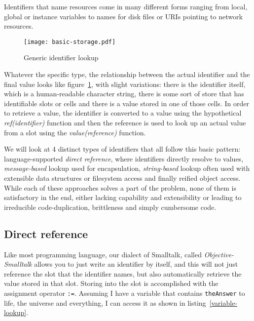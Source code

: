 \documentclass[preprint,authoryear]{acm_proc_article-sp}
\begin{document}
Identifiers that name resources come in many different forms ranging from local,
global or instance variables to names for disk files or URIs pointing to network resources.

\begin{figure}[htbp]
\label{identifier-eval}
\begin{center}
\texttt{[image: basic-storage.pdf]}
\caption{Generic identifier lookup}
\end{center}
\end{figure}

Whatever the specific type, the relationship between the actual identifier and the
final value looks like figure~\ref{identifier-eval}, with slight variations:   there is
the identifier itself, which is a human-readable character string, there is some sort
of store that has identifiable slots or cells and there is a value stored in one of those
cells.   In order to retrieve a value, the identifier is converted to a value using the
hypothetical {\em ref(identifier)} function and then the reference is used to look up an actual
value from a slot using the {\em value(reference)} function.


We will look at 4 distinct types of identifiers that all follow this basic pattern:  language-supported 
{\em direct reference}, where identifiers directly resolve to values, {\em message-based} lookup
used for encapsulation,
{\em string-based} lookup often used with extensible data structures or filesystem access and
finally reified object access.   While each of these approaches solves a part of the problem,
none of them is satisfactory in the end, either lacking capability and extensibility or leading to
irreducible code-duplication, brittleness and simply cumbersome code.

\subsection{Direct reference}
\label{direct-reference}
Like most programming language, our dialect of Smalltalk\cite{Goldberg1983}, called
{\em Objective-Smalltalk} allows you to just write 
an identifier by itself, and this will not just reference the slot that the identifier names, but also
automatically retrieve the value stored in that slot.  Storing into the slot is accomplished with
the assignment operator {\tt :=}.    Assuming I have a variable that contains {\tt theAnswer} to 
life, the universe and everything, I can access it as shown in listing~\ref{variable-lookup}.
\end{document}

